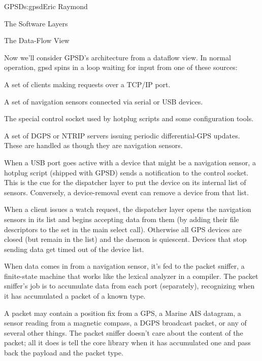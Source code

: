 \begin{aosachapter}{GPSD}{s:gpsd}{Eric Raymond}
\begin{aosasect1}{The Software Layers}
\end{aosasect1}

\begin{aosasect1}{The Data-Flow View}

Now we'll consider GPSD's architecture from a dataflow view.  In
normal operation, gpsd spins in a loop waiting for input from one of
these sources:

\begin{aosaenumerate}

  \item A set of clients making requests over a TCP/IP port.

  \item A set of navigation sensors connected via serial or USB
    devices.

  \item The special control socket used by hotplug scripts and some
    configuration tools.

  \item A set of DGPS or NTRIP servers issuing periodic
    differential-GPS updates.  These are handled as though they are
    navigation sensors.

\end{aosaenumerate}

When a USB port goes active with a device that might be a navigation
sensor, a hotplug script (shipped with GPSD) sends a notification to
the control socket.  This is the cue for the dispatcher layer to put
the device on its internal list of sensors.  Conversely, a
device-removal event can remove a device from that list.

When a client issues a watch request, the dispatcher layer opens the
navigation sensors in its list and begins accepting data from them (by
adding their file descriptors to the set in the main select
call). Otherwise all GPS devices are closed (but remain in the list)
and the daemon is quiescent. Devices that stop sending data get timed
out of the device list.

When data comes in from a navigation sensor, it's fed to the packet
sniffer, a finite-state machine that works like the lexical analyzer
in a compiler.  The packet sniffer's job is to accumulate data from
each port (separately), recognizing when it has accumulated a packet
of a known type.

A packet may contain a position fix from a GPS, a Marine AIS datagram,
a sensor reading from a magnetic compass, a DGPS broadcast packet, or any
of several other things.  The packet sniffer doesn't care about the 
content of the packet; all it does is tell the core library when it
has accumulated one and pass back the payload and the packet type.


\end{aosasect1}
\end{aosachapter}
